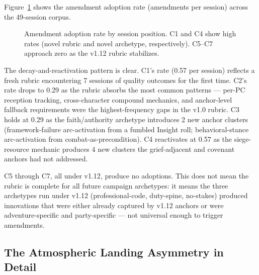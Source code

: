 Figure~\ref{fig:amendment-rate} shows the amendment adoption rate (amendments per session)
across the 49-session corpus.

\begin{figure}[t]
  \centering
  \caption{Amendment adoption rate by session position. C1 and C4 show high rates
    (novel rubric and novel archetype, respectively). C5--C7 approach zero
    as the v1.12 rubric stabilizes.}
  \label{fig:amendment-rate}
\end{figure}

The decay-and-reactivation pattern is clear. C1's rate (0.57 per session) reflects a
fresh rubric encountering 7 sessions of quality outcomes for the first time. C2's rate
drops to 0.29 as the rubric absorbs the most common patterns --- per-PC reception
tracking, cross-character compound mechanics, and anchor-level fallback requirements
were the highest-frequency gaps in the v1.0 rubric. C3 holds at 0.29 as the
faith/authority archetype introduces 2 new anchor clusters (framework-failure
arc-activation from a fumbled Insight roll; behavioral-stance arc-activation from
combat-as-precondition). C4 reactivates at 0.57 as the siege-resource mechanic produces
4 new clusters the grief-adjacent and covenant anchors had not addressed.

C5 through C7, all under v1.12, produce no adoptions. This does not mean the rubric
is complete for all future campaign archetypes: it means the three archetypes run
under v1.12 (professional-code, duty-spine, no-stakes) produced innovations that were
either already captured by v1.12 anchors or were adventure-specific and party-specific
--- not universal enough to trigger amendments.

\subsection{The Atmospheric Landing Asymmetry in Detail}

